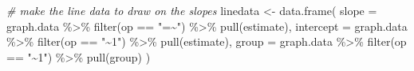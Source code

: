 \documentclass[
  man]{apa6}
\newenvironment{Shaded}{\begin{snugshade}}{\end{snugshade}}
\newcommand{\AttributeTok}[1]{\textcolor[rgb]{0.77,0.63,0.00}{#1}}
\newcommand{\CommentTok}[1]{\textcolor[rgb]{0.56,0.35,0.01}{\textit{#1}}}
\newcommand{\FunctionTok}[1]{\textcolor[rgb]{0.00,0.00,0.00}{#1}}
\newcommand{\NormalTok}[1]{#1}
\newcommand{\OtherTok}[1]{\textcolor[rgb]{0.56,0.35,0.01}{#1}}
\newcommand{\SpecialCharTok}[1]{\textcolor[rgb]{0.00,0.00,0.00}{#1}}
\newcommand{\StringTok}[1]{\textcolor[rgb]{0.31,0.60,0.02}{#1}}
\begin{document}
\begin{Shaded}
\begin{Highlighting}[]
  \CommentTok{\# make the line data to draw on the slopes}
\NormalTok{  linedata }\OtherTok{\textless{}{-}} \FunctionTok{data.frame}\NormalTok{(}
  \AttributeTok{slope =}\NormalTok{ graph.data }\SpecialCharTok{\%\textgreater{}\%} \FunctionTok{filter}\NormalTok{(op }\SpecialCharTok{==} \StringTok{"=\textasciitilde{}"}\NormalTok{) }\SpecialCharTok{\%\textgreater{}\%} \FunctionTok{pull}\NormalTok{(estimate), }
  \AttributeTok{intercept =}\NormalTok{ graph.data }\SpecialCharTok{\%\textgreater{}\%} \FunctionTok{filter}\NormalTok{(op }\SpecialCharTok{==} \StringTok{"\textasciitilde{}1"}\NormalTok{) }\SpecialCharTok{\%\textgreater{}\%} \FunctionTok{pull}\NormalTok{(estimate), }
  \AttributeTok{group =}\NormalTok{ graph.data }\SpecialCharTok{\%\textgreater{}\%} \FunctionTok{filter}\NormalTok{(op }\SpecialCharTok{==} \StringTok{"\textasciitilde{}1"}\NormalTok{) }\SpecialCharTok{\%\textgreater{}\%} \FunctionTok{pull}\NormalTok{(group)}
\NormalTok{  )}
  

\end{Highlighting}
\end{Shaded}
\end{document}
